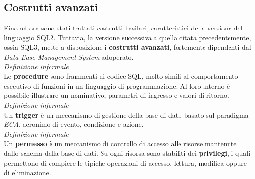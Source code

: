 \documentclass{article}
\begin{document}
\subsection*{Costrutti avanzati}
\large
Fino ad ora sono stati trattati costrutti basilari, caratteristici della versione del linguaggio SQL2. Tuttavia, la versione successiva a quella citata precedentemente, ossia SQL3, mette a disposizione i \textbf{costrutti avanzati}, fortemente dipendenti dal \textit{Data-Base-Management-System} adoperato.\vspace*{14pt}\\
\textit{Definizione informale}\\
Le \textbf{procedure} sono frammenti di codice SQL, molto simili al comportamento esecutivo di funzioni in un linguaggio di programmazione. Al loro interno è possibile illustrare un nominativo, parametri di ingresso e valori di ritorno.\vspace*{14pt}\\
\textit{Definizione informale}\\
Un \textbf{trigger} è un meccanismo di gestione della base di dati, basato sul paradigma \textit{ECA}, acronimo di evento, condizione e azione.\vspace*{14pt}\\
\textit{Definizione informale}\\
Un \textbf{permesso} è un meccanismo di controllo di accesso alle risorse mantenute dallo schema della base di dati. Su ogni risorsa sono stabiliti dei \textbf{privilegi}, i quali permettono di compiere le tipiche operazioni di accesso, lettura, modifica oppure di eliminazione.
\end{document}
